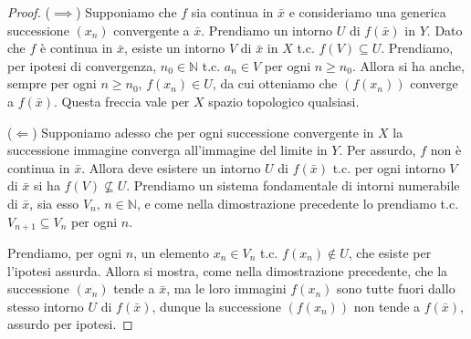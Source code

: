 \begin{proof}
	($\implies$) Supponiamo che $f$ sia continua in $\bar{x}$ e consideriamo una
	generica successione $(x_n)$ convergente a $\bar{x}$. Prendiamo un intorno
	$U$ di $f(\bar{x})$ in $Y$. Dato che $f$ è continua in $\bar{x}$, esiste un
	intorno $V$ di $\bar{x}$ in $X$ t.c. $f(V) \subseteq U$. Prendiamo, per
	ipotesi di convergenza, $n_0 \in \mathbb{N}$ t.c. $a_n \in V$ per ogni $n
	\ge n_0$. Allora si ha anche, sempre per ogni $n \ge n_0$, $f(x_n) \in U$,
	da cui otteniamo che $(f(x_n))$ converge a $f(\bar{x})$. Questa freccia vale
	per $X$ spazio topologico qualsiasi.

	($\Leftarrow$) Supponiamo adesso che per ogni successione convergente in $X$
	la successione immagine converga all'immagine del limite in $Y$. Per
	assurdo, $f$ non è continua in $\bar{x}$. Allora deve esistere un intorno
	$U$ di $f(\bar{x})$ t.c. per ogni intorno $V$ di $\bar{x}$ si ha $f(V) \not
	\subseteq U$. Prendiamo un sistema fondamentale di intorni numerabile di
	$\bar{x}$, sia esso $V_n, \, n \in \mathbb{N}$, e come nella dimostrazione
	precedente lo prendiamo t.c. $V_{n+1} \subseteq V_n$ per ogni $n$.

	Prendiamo, per ogni $n$, un elemento $x_n \in V_n$ t.c. $f(x_n) \not\in U$,
	che esiste per l'ipotesi assurda. Allora si mostra, come nella dimostrazione
	precedente, che la successione $(x_n)$ tende a $\bar{x}$, ma le loro
	immagini $f(x_n)$ sono tutte fuori dallo stesso intorno $U$ di $f(\bar{x})$,
	dunque la successione $(f(x_n))$ non tende a $f(\bar{x})$, assurdo per
	ipotesi.
\end{proof}
